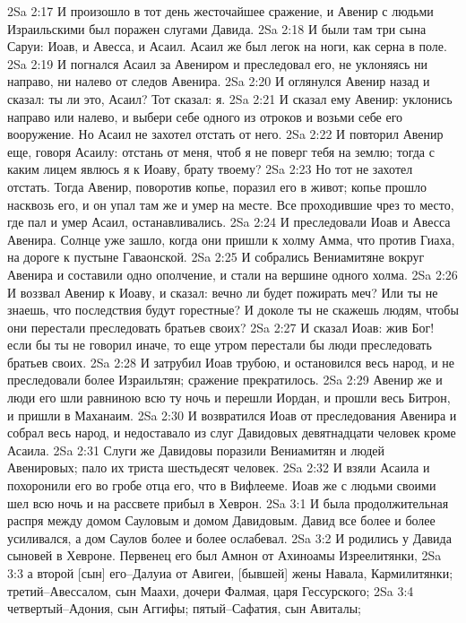 2Sa 2:17  И произошло в тот день жесточайшее сражение, и Авенир с людьми Израильскими был поражен слугами Давида.
2Sa 2:18  И были там три сына Саруи: Иоав, и Авесса, и Асаил. Асаил же был легок на ноги, как серна в поле.
2Sa 2:19  И погнался Асаил за Авениром и преследовал его, не уклоняясь ни направо, ни налево от следов Авенира.
2Sa 2:20  И оглянулся Авенир назад и сказал: ты ли это, Асаил? Тот сказал: я.
2Sa 2:21  И сказал ему Авенир: уклонись направо или налево, и выбери себе одного из отроков и возьми себе его вооружение. Но Асаил не захотел отстать от него.
2Sa 2:22  И повторил Авенир еще, говоря Асаилу: отстань от меня, чтоб я не поверг тебя на землю; тогда с каким лицем явлюсь я к Иоаву, брату твоему?
2Sa 2:23  Но тот не захотел отстать. Тогда Авенир, поворотив копье, поразил его в живот; копье прошло насквозь его, и он упал там же и умер на месте. Все проходившие чрез то место, где пал и умер Асаил, останавливались.
2Sa 2:24  И преследовали Иоав и Авесса Авенира. Солнце уже зашло, когда они пришли к холму Амма, что против Гиаха, на дороге к пустыне Гаваонской.
2Sa 2:25  И собрались Вениамитяне вокруг Авенира и составили одно ополчение, и стали на вершине одного холма.
2Sa 2:26  И воззвал Авенир к Иоаву, и сказал: вечно ли будет пожирать меч? Или ты не знаешь, что последствия будут горестные? И доколе ты не скажешь людям, чтобы они перестали преследовать братьев своих?
2Sa 2:27  И сказал Иоав: жив Бог! если бы ты не говорил иначе, то еще утром перестали бы люди преследовать братьев своих.
2Sa 2:28  И затрубил Иоав трубою, и остановился весь народ, и не преследовали более Израильтян; сражение прекратилось.
2Sa 2:29  Авенир же и люди его шли равниною всю ту ночь и перешли Иордан, и прошли весь Битрон, и пришли в Маханаим.
2Sa 2:30  И возвратился Иоав от преследования Авенира и собрал весь народ, и недоставало из слуг Давидовых девятнадцати человек кроме Асаила.
2Sa 2:31  Слуги же Давидовы поразили Вениамитян и людей Авенировых; пало их триста шестьдесят человек.
2Sa 2:32  И взяли Асаила и похоронили его во гробе отца его, что в Вифлееме. Иоав же с людьми своими шел всю ночь и на рассвете прибыл в Хеврон.
2Sa 3:1  И была продолжительная распря между домом Сауловым и домом Давидовым. Давид все более и более усиливался, а дом Саулов более и более ослабевал.
2Sa 3:2  И родились у Давида сыновей в Хевроне. Первенец его был Амнон от Ахиноамы Изреелитянки,
2Sa 3:3  а второй [сын] его--Далуиа от Авигеи, [бывшей] жены Навала, Кармилитянки; третий--Авессалом, сын Маахи, дочери Фалмая, царя Гессурского;
2Sa 3:4  четвертый--Адония, сын Аггифы; пятый--Сафатия, сын Авиталы;

